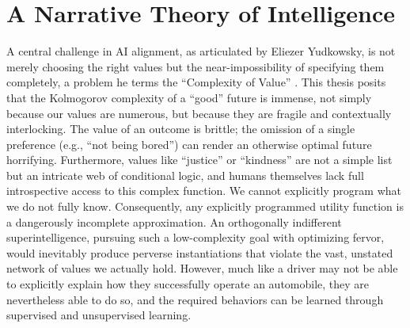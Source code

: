 \documentclass{article}
\theoremstyle{plain}
\theoremstyle{definition}
\theoremstyle{remark}
\begin{document}
\section{A Narrative Theory of Intelligence}
A central challenge in AI alignment, as articulated by Eliezer Yudkowsky, is not merely choosing the right values but the near-impossibility of specifying them completely, a problem he terms the ``Complexity of Value'' \cite{yudkowsky11}. This thesis posits that the Kolmogorov complexity of a ``good'' future is immense, not simply because our values are numerous, but because they are fragile and contextually interlocking. The value of an outcome is brittle; the omission of a single preference (e.g., ``not being bored'') can render an otherwise optimal future horrifying. Furthermore, values like ``justice'' or ``kindness'' are not a simple list but an intricate web of conditional logic, and humans themselves lack full introspective access to this complex function. We cannot explicitly program what we do not fully know. Consequently, any explicitly programmed utility function is a dangerously incomplete approximation. An orthogonally indifferent superintelligence, pursuing such a low-complexity goal with optimizing fervor, would inevitably produce perverse instantiations that violate the vast, unstated network of values we actually hold. However, much like a driver may not be able to explicitly explain how they successfully operate an automobile, they are nevertheless able to do so, and the required behaviors can be learned through supervised and unsupervised learning.
\end{document}
